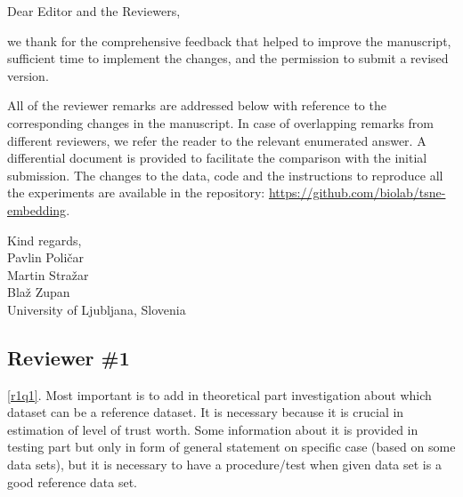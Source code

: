 \documentclass{article}
\newcounter{rtaskno}
\newcommand{\rtask}[1]{\refstepcounter{rtaskno}\label{#1}}
\newcommand{\reviewc}[2]{\begin{leftbar}\noindent\rtask{#1}\ref{#1}. #2\end{leftbar}}
\newlength{\leftbarwidth}
\newlength{\leftbarsep}
\renewenvironment{leftbar}{%
    \def\FrameCommand{{\color{black}{\vrule width \leftbarwidth\relax\hspace {\leftbarsep}}}}%
    \MakeFramed {\advance \hsize -\width \FrameRestore }%
}{\endMakeFramed}
\begin{document}

\vspace{5mm}

\vspace{5mm}


\noindent Dear Editor and the Reviewers, \\
 
\vspace{3mm}

\noindent we thank for the comprehensive feedback that helped to improve the
manuscript, sufficient time to implement the changes, and the permission to
submit a revised version. 
 
\vspace{3mm}

All of the reviewer remarks are addressed below with reference to the
corresponding changes in the manuscript.  In case of overlapping remarks from
different reviewers, we refer the reader to the relevant enumerated answer. A
differential document is provided to facilitate the comparison with the initial
submission. The changes to the data, code and the instructions to reproduce all
the experiments are available in the repository:
\url{https://github.com/biolab/tsne-embedding}.

\vspace{3mm}

\begin{flushright}
\noindent Kind regards, \\ 
\vspace{2mm}
Pavlin Poli\v{c}ar \\
Martin Stra\v{z}ar \\
Bla\v{z} Zupan \\ 
\vspace{2mm}
University of Ljubljana, Slovenia 
\end{flushright}

\vspace{10mm}


\subsection*{Reviewer \#1}

\reviewc{r1q1}{Most important is to add in theoretical part investigation about which dataset can be a reference dataset. It is necessary because it is crucial in estimation of level of trust worth.
Some information about it is provided in testing part but only in form of general statement on specific case (based on some data sets), but it is necessary to have a procedure/test when given data set is a good reference data set.}
\end{document}
